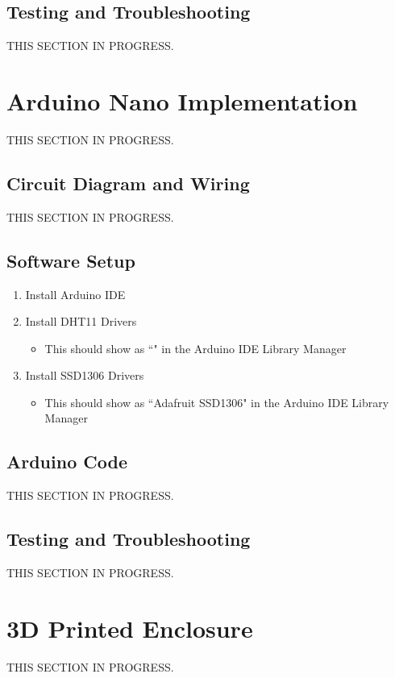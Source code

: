 \documentclass{article}
\begin{document}
\begin{multicols}{2}
			\subsection{Testing and Troubleshooting}
			THIS SECTION IN PROGRESS.
		
		\section{Arduino Nano Implementation}
		THIS SECTION IN PROGRESS.
		
			\subsection{Circuit Diagram and Wiring}
			THIS SECTION IN PROGRESS.
			
			\subsection{Software Setup}
			\begin{enumerate}
				\item Install Arduino IDE
				\item Install DHT11 Drivers
				\begin{itemize}
					\item This should show as ``" in the Arduino IDE Library Manager
				\end{itemize}
				\item Install SSD1306 Drivers
				\begin{itemize}
					\item This should show as ``Adafruit SSD1306" in the Arduino IDE Library Manager
				\end{itemize}
			\end{enumerate}
			
			\subsection{Arduino Code}
			THIS SECTION IN PROGRESS.
			
			\subsection{Testing and Troubleshooting}
			THIS SECTION IN PROGRESS.
		
		\section{3D Printed Enclosure}
		THIS SECTION IN PROGRESS.
		

\end{multicols}
\end{document}
